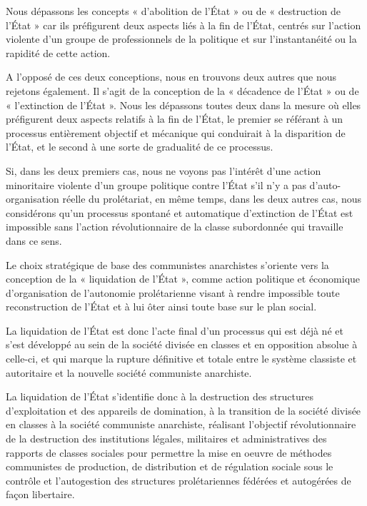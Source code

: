 Nous dépassons les concepts « d'abolition de l'État » ou de « destruction de l'État » car ils préfigurent deux aspects liés à la fin de l'État, centrés sur l'action violente d'un groupe de professionnels de la politique et sur l'instantanéité ou la rapidité de cette action.

A l'opposé de ces deux conceptions, nous en trouvons deux autres que nous rejetons également. Il s'agit de la conception de la « décadence de l'État » ou de « l'extinction de l'État ». Nous les dépassons toutes deux dans la mesure où elles préfigurent deux aspects relatifs à la fin de l'État, le premier se référant à un processus entièrement objectif et mécanique qui conduirait à la disparition de l'État, et le second à une sorte de gradualité de ce processus.

Si, dans les deux premiers cas, nous ne voyons pas l'intérêt d'une action minoritaire violente d'un groupe politique contre l'État s'il n'y a pas d'auto-organisation réelle du prolétariat, en même temps, dans les deux autres cas, nous considérons qu'un processus spontané et automatique d'extinction de l'État est impossible sans l'action révolutionnaire de la classe subordonnée qui travaille dans ce sens.

Le choix stratégique de base des communistes anarchistes s'oriente vers la conception de la « liquidation de l'État », comme action politique et économique d'organisation de l'autonomie prolétarienne visant à rendre impossible toute reconstruction de l'État et à lui ôter ainsi toute base sur le plan social.

La liquidation de l'État est donc l'acte final d'un processus qui est déjà né et s'est développé au sein de la société divisée en classes et en opposition absolue à celle-ci, et qui marque la rupture définitive et totale entre le système classiste et autoritaire et la nouvelle société communiste anarchiste.

La liquidation de l'État s'identifie donc à la destruction des structures d'exploitation et des appareils de domination, à la transition de la société divisée en classes à la société communiste anarchiste, réalisant l'objectif révolutionnaire de la destruction des institutions légales, militaires et administratives des rapports de classes sociales pour permettre la mise en oeuvre de méthodes communistes de production, de distribution et de régulation sociale sous le contrôle et l'autogestion des structures prolétariennes fédérées et autogérées de façon libertaire.


